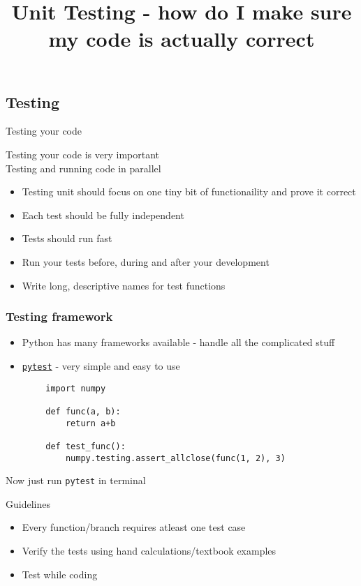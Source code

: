 \documentclass[11pt,professionalfonts]{beamer}
\title[Unit Testing]{\large \textbf{Unit Testing - how do I make sure my code is actually correct}}
\author{\vspace*{-0.3cm}}
\institute{
  \footnotesize
  {\normalsize\bf{Shankar Kulumani}}\\
  \vspace*{0.2cm}
    \textbf{Flight Dynamics \& Control Lab}\\ \vspace*{0.5cm}
  \begin{figure} %
        \texttt{[image: figures/gw\_txh\_2cs\_pos.pdf]}
    \end{figure}
}
\date{}
\begin{document}

\setcounter{framenumber}{-1}
\begin{frame} %
  \titlepage
\end{frame}   %

\section*{}
\subsection*{Testing}  
\begin{frame}{Testing your code}
    \begin{alertblock}{}
        \centering 
        Testing your code is very important \\
        Testing and running code in parallel
    \end{alertblock}
    \pause
    \begin{itemize}
        \item Testing unit should focus on one tiny bit of functionaility and prove it correct
        \item Each test should be fully independent
        \item Tests should run fast
        \item Run your tests before, during and after your development
        \item Write long, descriptive names for test functions
    \end{itemize}
\end{frame}

\begin{frame}[fragile]\frametitle{Testing framework}
    \begin{itemize}
        \item Python has many frameworks available - handle all the complicated stuff
        \item \texttt{\href{https://docs.pytest.org/en/latest/}{pytest}} - very simple and easy to use
    \end{itemize}
    \begin{verbatim}
        import numpy

        def func(a, b):
            return a+b

        def test_func():
            numpy.testing.assert_allclose(func(1, 2), 3)

    \end{verbatim}
    \pause
    \begin{alertblock}{}
        Now just run \texttt{pytest} in terminal
    \end{alertblock}
\end{frame}

\begin{frame}{Guidelines}
    \begin{itemize}
        \item Every function/branch requires atleast one test case
        \item Verify the tests using hand calculations/textbook examples
        \item Test while coding
    \end{itemize}
\end{frame}
\end{document}

